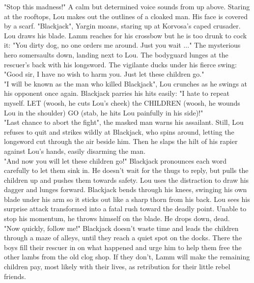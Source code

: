 "Stop this madness!" A calm but determined voice sounds from up above. Staring at the rooftops, Lou makes out the outlines of a cloaked man. His face is covered by a scarf. "Blackjack", Yargin moans, staring up at Korvosa's caped crusader.\\

Lou draws his blade. Lamm reaches for his crossbow but he is too drunk to cock it: "You dirty dog, no one orders me around. Just you wait ..." The mysterious hero somersaults down, landing next to Lou. The bodyguard lunges at the rescuer's back with his longsword. The vigilante ducks under his fierce swing: "Good sir, I have no wish to harm you. Just let these children go."\\

"I will be known as the man who killed Blackjack", Lou crunches as he swings at his opponent once again. Blackjack parries his hits easily: "I hate to repeat myself. LET (woosh, he cuts Lou's cheek) the CHILDREN (woosh, he wounds Lou in the shoulder) GO (stab, he hits Lou painfully in his side)!"\\

"Last chance to abort the fight", the masked man warns his assailant. Still, Lou refuses to quit and strikes wildly at Blackjack, who spins around, letting the longsword cut through the air beside him. Then he slaps the hilt of his rapier against Lou's hands, easily disarming the man.\\

"And now you will let these children go!" Blackjack pronounces each word carefully to let them sink in. He doesn't wait for the thugs to reply, but pulls the children up and pushes them towards safety. Lou uses the distraction to draw his dagger and lunges forward. Blackjack bends through his knees, swinging his own blade under his arm so it sticks out like a sharp thorn from his back. Lou sees his surprise attack transformed into a fatal rush toward the deadly point. Unable to stop his momentum, he throws himself on the blade. He drops down, dead.\\

"Now quickly, follow me!" Blackjack doesn't waste time and leads the children through a maze of alleys, until they reach a quiet spot on the docks. There the boys fill their rescuer in on what happened and urge him to help them free the other lambs from the old clog shop. If they don't, Lamm will make the remaining children pay, most likely with their lives, as retribution for their little rebel friends.\\

